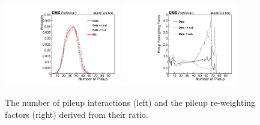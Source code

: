 \begin{figure}[ht]
	\centering
	\includegraphics[width=0.45\textwidth]{figures/PileupDists.pdf}
	\hspace{0.01\textwidth}
	\includegraphics[width=0.45\textwidth]{figures/PileupRatioDists.pdf}
        \caption[Pileup Re-weighting Histograms]{The number of pileup interactions (left) and the pileup re-weighting factors (right) derived from their ratio.}
        \label{fig:pileup}
\end{figure}

